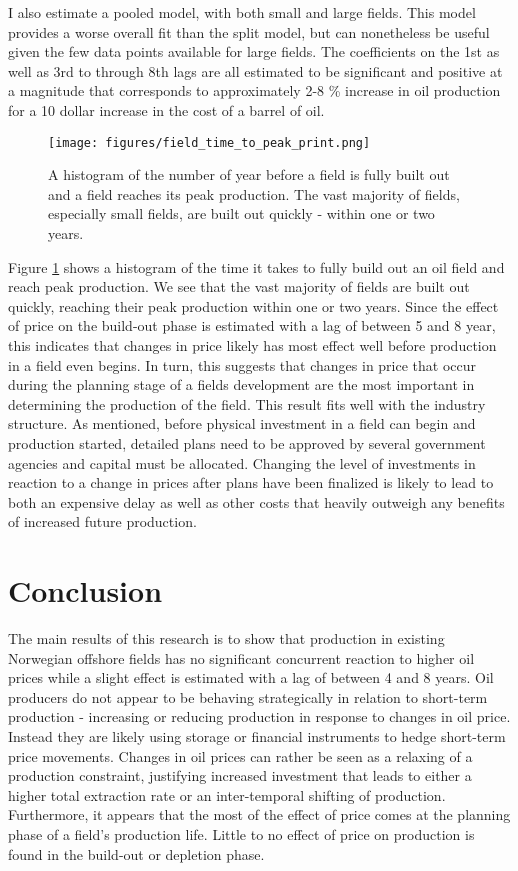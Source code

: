 \documentclass[12pt]{article}
\begin{document}
I also estimate a pooled model, with both small and large fields.  This model provides a worse overall fit than the split model, but can nonetheless be useful given the few data points available for large fields.  The coefficients on the 1st as well as 3rd to through 8th lags are all estimated to be significant and positive at a magnitude that corresponds to approximately 2-8 \% increase in oil production for a 10 dollar increase in the cost of a barrel of oil.

\begin{figure}
	\texttt{[image: figures/field\_time\_to\_peak\_print.png]}
	\caption{A histogram of the number of year before a field is fully built out and a field reaches its peak production.  The vast majority of fields, especially small fields, are built out quickly - within one or two years.}
	\label{gam_buildout_hist}
\end{figure}

Figure \ref{gam_buildout_hist} shows a histogram of the time it takes to fully build out an oil field and reach peak production.  We see that the vast majority of fields are built out quickly, reaching their peak production within one or two years.  Since the effect of price on the build-out phase is estimated with a lag of between 5 and 8 year, this indicates that changes in price likely has most effect well before production in a field even begins.  In turn, this suggests that changes in price that occur during the planning stage of a fields development are the most important in determining the production of the field.  This result fits well with the industry structure.  As mentioned, before physical investment in a field can begin and production started, detailed plans need to be approved by several government agencies and capital must be allocated.  Changing the level of investments in reaction to a change in prices after plans have been finalized is likely to lead to both an expensive delay as well as other costs that heavily outweigh any benefits of increased future production.  




\section{Conclusion}

The main results of this research is to show that production in existing Norwegian offshore fields has no significant concurrent reaction to higher oil prices while a slight effect is estimated  with a lag of between 4 and 8 years.  Oil producers do not appear to be behaving strategically in relation to short-term production - increasing or reducing production in response to changes in oil price.  Instead they are likely using storage or financial instruments to hedge short-term price movements. Changes in oil prices can rather be seen as a relaxing of a production constraint, justifying increased investment that leads to either a higher total extraction rate or an inter-temporal shifting of production. Furthermore, it appears that the most of the effect of price comes at the planning phase of a field's production life.  Little to no effect of price on production is found in the build-out or depletion phase.
\end{document}
